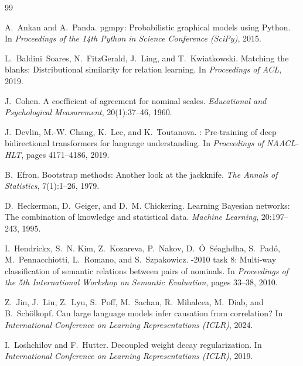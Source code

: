 \documentclass[11pt,a4paper]{article}
\begin{document}
\begin{thebibliography}{99}
\setlength{\itemsep}{2pt}
\small

A.~Ankan and A.~Panda.
\newblock pgmpy: Probabilistic graphical models using Python.
\newblock In \emph{Proceedings of the 14th Python in Science Conference (SciPy)}, 2015.

L.~Baldini~Soares, N.~FitzGerald, J.~Ling, and T.~Kwiatkowski.
\newblock Matching the blanks: Distributional similarity for relation learning.
\newblock In \emph{Proceedings of ACL}, 2019.

J.~Cohen.
\newblock A coefficient of agreement for nominal scales.
\newblock \emph{Educational and Psychological Measurement}, 20(1):37--46, 1960.

J.~Devlin, M.-W. Chang, K.~Lee, and K.~Toutanova.
: Pre-training of deep bidirectional transformers for language understanding.
\newblock In \emph{Proceedings of NAACL-HLT}, pages 4171--4186, 2019.

B.~Efron.
\newblock Bootstrap methods: Another look at the jackknife.
\newblock \emph{The Annals of Statistics}, 7(1):1--26, 1979.

D.~Heckerman, D.~Geiger, and D.~M. Chickering.
\newblock Learning {B}ayesian networks: The combination of knowledge and statistical data.
\newblock \emph{Machine Learning}, 20:197--243, 1995.

I.~Hendrickx, S.~N. Kim, Z.~Kozareva, P.~Nakov, D.~{\'O}~S{\'e}aghdha, S.~Pad{\'o}, M.~Pennacchiotti, L.~Romano, and S.~Szpakowicz.
-2010 task 8: Multi-way classification of semantic relations between pairs of nominals.
\newblock In \emph{Proceedings of the 5th International Workshop on Semantic Evaluation}, pages 33--38, 2010.

Z.~Jin, J.~Liu, Z.~Lyu, S.~Poff, M.~Sachan, R.~Mihalcea, M.~Diab, and B.~Sch{\"o}lkopf.
\newblock Can large language models infer causation from correlation?
\newblock In \emph{International Conference on Learning Representations (ICLR)}, 2024.

I.~Loshchilov and F.~Hutter.
\newblock Decoupled weight decay regularization.
\newblock In \emph{International Conference on Learning Representations (ICLR)}, 2019.


\end{thebibliography}
\end{document}
